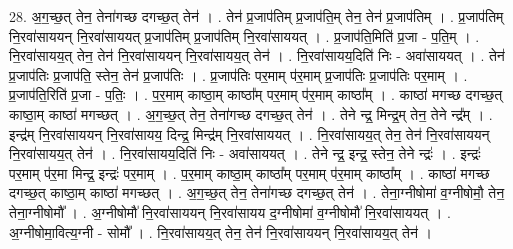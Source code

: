 \documentclass[17pt]{extarticle}
\begin{document}
28. अ॒ग॒च्छ॒त् तेन॒ तेना॑गच्छ दगच्छ॒त् तेन॑ । . तेन॑ प्र॒जाप॑तिम् प्र॒जाप॑ति॒म् तेन॒ तेन॑ प्र॒जाप॑तिम् । . प्र॒जाप॑तिम् नि॒रवा॑साययन् नि॒रवा॑साययत् प्र॒जाप॑तिम् प्र॒जाप॑तिम् नि॒रवा॑साययत् । . प्र॒जाप॑ति॒मिति॑ प्र॒जा - प॒ति॒म् । . नि॒रवा॑सायय॒त् तेन॒ तेन॑ नि॒रवा॑साययन् नि॒रवा॑सायय॒त् तेन॑ । . नि॒रवा॑सायय॒दिति॑ निः - अवा॑साययत् । . तेन॑ प्र॒जाप॑तिः प्र॒जाप॑ति॒ स्तेन॒ तेन॑ प्र॒जाप॑तिः । . प्र॒जाप॑तिः पर॒माम् प॑र॒माम् प्र॒जाप॑तिः प्र॒जाप॑तिः पर॒माम् । . प्र॒जाप॑ति॒रिति॑ प्र॒जा - प॒तिः॒ । . प॒र॒माम् काष्ठा॒म् काष्ठा᳚म् पर॒माम् प॑र॒माम् काष्ठा᳚म् । . काष्ठा॑ मगच्छ दगच्छ॒त् काष्ठा॒म् काष्ठा॑ मगच्छत् । . अ॒ग॒च्छ॒त् तेन॒ तेना॑गच्छ दगच्छ॒त् तेन॑ । . तेने न्द्र॒ मिन्द्र॒म् तेन॒ तेने न्द्र᳚म् । . इन्द्र॑म् नि॒रवा॑साययन् नि॒रवा॑सायय॒ दिन्द्र॒ मिन्द्र॑म् नि॒रवा॑साययत् । . नि॒रवा॑सायय॒त् तेन॒ तेन॑ नि॒रवा॑साययन् नि॒रवा॑सायय॒त् तेन॑ । . नि॒रवा॑सायय॒दिति॑ निः - अवा॑साययत् । . तेने न्द्र॒ इन्द्र॒ स्तेन॒ तेने न्द्रः॑ । . इन्द्रः॑ पर॒माम् प॑र॒मा मिन्द्र॒ इन्द्रः॑ पर॒माम् । . प॒र॒माम् काष्ठा॒म् काष्ठा᳚म् पर॒माम् प॑र॒माम् काष्ठा᳚म् । . काष्ठा॑ मगच्छ दगच्छ॒त् काष्ठा॒म् काष्ठा॑ मगच्छत् । . अ॒ग॒च्छ॒त् तेन॒ तेना॑गच्छ दगच्छ॒त् तेन॑ । . तेना॒ग्नीषोमा॑ व॒ग्नीषोमौ॒ तेन॒ तेना॒ग्नीषोमौ᳚ । . अ॒ग्नीषोमौ॑ नि॒रवा॑साययन् नि॒रवा॑सायय द॒ग्नीषोमा॑ व॒ग्नीषोमौ॑ नि॒रवा॑साययत् । . अ॒ग्नीषोमा॒वित्य॒ग्नी - सोमौ᳚ । . नि॒रवा॑सायय॒त् तेन॒ तेन॑ नि॒रवा॑साययन् नि॒रवा॑सायय॒त् तेन॑ । \newline
\end{document}
